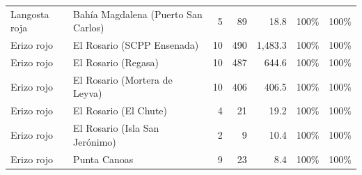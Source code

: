\begin{longtable}{llrrrrc}
Langosta roja & Bahía Magdalena (Puerto San Carlos) & 5 & 89 & 18.8 & 100\% & 100\% \\
Erizo rojo & El Rosario (SCPP Ensenada) & 10 & 490 & 1,483.3 & 100\% & 100\% \\
Erizo rojo & El Rosario (Regasa) & 10 & 487 & 644.6 & 100\% & 100\% \\
Erizo rojo & El Rosario (Mortera de Leyva) & 10 & 406 & 406.5 & 100\% & 100\% \\
Erizo rojo & El Rosario (El Chute) & 4 & 21 & 19.2 & 100\% & 100\% \\
Erizo rojo & El Rosario (Isla San Jerónimo) & 2 & 9 & 10.4 & 100\% & 100\% \\
Erizo rojo & Punta Canoas & 9 & 23 & 8.4 & 100\% & 100\% \\
\end{longtable}
\endgroup
